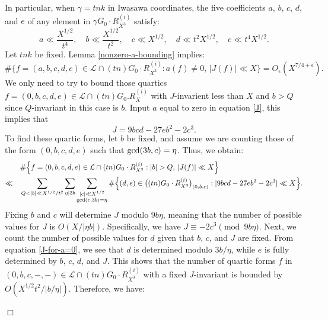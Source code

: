 \documentclass{article}
\newenvironment{customproof}[1][]
{\par\noindent{\textbf{Proof of #1:}}\quad}
{$\Box$ \vspace{2 ex}}
\def \gcd{{\rm gcd}}
\begin{document}
\begin{customproof}[Theorem \ref{IJ-Sieve}]
In particular, when $\gamma = tnk$ in Iwasawa coordinates, the five coefficients $a$, $b$, $c$, $d$, and $e$ of any element in $\gamma G_0 \cdot R^{(i)}_{X^3}$ satisfy:
\begin{equation} \label{box-bound}
a \ll \frac{X^{1/2}}{t^4}, \quad b \ll \frac{X^{1/2}}{t^2}, \quad c \ll X^{1/2}, \quad d \ll t^2 X^{1/2}, \quad e \ll t^4 X^{1/2}.
\end{equation}
Let $tnk$ be fixed. Lemma \ref{nonzero-a-bounding} implies:
\begin{equation*}
    \# \Big\{f=(a,b,c,d,e) \in  \mathcal{L}\cap (tn)G_0\cdot R^{(i)}_{X^3}: a(f)\neq 0, \, |J(f)| \ll X \Big\} = O_{\epsilon}(X^{7/4+\epsilon}).
\end{equation*}
We only need to try to bound those quartics  $f=(0,b,c,d,e) \in \mathcal{L}\cap (tn)G_0.R^{(i)}_{X}$ with $J$-invarient less than $X$ and $b>Q$ since $Q$-invariant in this case is $b$. Input $a$ equal to zero in equation \eqref{J}, this implies that 
\begin{equation}\label{J-for-a=0}
    J= 9bcd-27eb^2-2c^3.
\end{equation}
To find these quartic forms, let $b$ be fixed, and assume we are counting those of the form $(0, b, c, d, e)$ such that $\gcd(3b, c) = \eta$. Thus, we obtain:
\begin{align*}
    &\# \Big\{f=(0,b,c,d,e) \in  \mathcal{L}\cap (tn)G_0\cdot R^{(i)}_{X^3}: |b|>Q, \, |J(f)| \ll X \Big\}\\ \ll \quad
    &\sum_{ Q<|b|\ll X^{1/2}/t^2} \sum_{\eta | 3b} \sum_{\substack{|c| \ll X^{1/2}\\\gcd(c,3b) =\eta}} \#\Big\{(d,e)\in \big((tn)G_0\cdot R^{(i)}_{X^3}\big)_{(0,b,c)}: |9bcd-27eb^2-2c^3|\ll X \Big\}.
\end{align*}
Fixing $b$ and $c$ will determine $J$ modulo $9b\eta$, meaning that the number of possible values for $J$ is $O(X/|\eta b|)$. Specifically, we have $J \equiv -2c^3 \pmod{9b\eta}$. Next, we count the number of possible values for $d$ given that $b$, $c$, and $J$ are fixed. From equation \eqref{J-for-a=0}, we see that $d$ is determined modulo $3b/\eta$, while $e$ is fully determined by $b$, $c$, $d$, and $J$.  This shows that the number of quartic forms $f$ in $(0,b,c,-,-) \in \mathcal{L} \cap (tn)G_0\cdot R^{(i)}_{X^3}$ with a fixed $J$-invariant is bounded by $O(X^{1/2}t^2/|b/\eta|)$. Therefore, we have:


\end{customproof}
\end{document}

